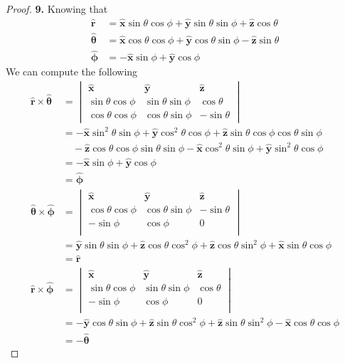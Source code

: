 \documentclass[11pt]{article}
\newcommand{\hatx}{\bm{\hat{x}}}
\newcommand{\haty}{\bm{\hat{y}}}
\newcommand{\hatz}{\bm{\hat{z}}}
\newcommand{\hatphi}{\bm{\hat{\phi}}}
\newcommand{\hatr}{\bm{\hat{r}}}
\newcommand{\hattheta}{\bm{\hat{\theta}}}
\theoremstyle{definition}
\begin{document}
\begin{proof}{\textbf{9.}}
    Knowing that
    \begin{align*}
        \hatr &= \hatx\sin\theta\cos\phi + \haty\sin\theta\sin\phi + \hatz\cos\theta\\
        \hattheta &= \hatx\cos\theta\cos\phi + \haty\cos\theta\sin\phi - \hatz\sin\theta\\
        \hatphi &= -\hatx \sin\phi + \haty\cos\phi
    \end{align*}
    We can compute the following
    \begin{align*}
        \hatr \times \hattheta &= \begin{vmatrix}
            \hatx & \haty & \hatz \\
            \sin\theta\cos\phi & \sin\theta\sin\phi & \cos\theta\\
            \cos\theta\cos\phi & \cos\theta\sin\phi &  -\sin\theta
        \end{vmatrix}\\
        &= -\hatx\sin^2\theta\sin\phi + \haty\cos^2\theta\cos\phi
        + \hatz\sin\theta\cos\phi\cos\theta\sin\phi\\
        &\quad - \hatz\cos\theta\cos\phi\sin\theta\sin\phi
        - \hatx\cos^2\theta\sin\phi +\haty\sin^2\theta\cos\phi \\
        &= -\hatx\sin\phi + \haty\cos\phi\\
        &= \hatphi\\
        \hattheta \times \hatphi &= \begin{vmatrix}
            \hatx & \haty & \hatz \\
            \cos\theta\cos\phi & \cos\theta\sin\phi & -\sin\theta\\
            -\sin\phi & \cos\phi & 0 \\
        \end{vmatrix}\\
        &= \haty\sin\theta\sin\phi + \hatz\cos\theta\cos^2\phi
        + \hatz\cos\theta\sin^2\phi + \hatx\sin\theta\cos\phi\\
        &= \hatr\\
        \hatr \times \hatphi &= \begin{vmatrix}
            \hatx & \haty & \hatz \\
            \sin\theta\cos\phi & \sin\theta\sin\phi & \cos\theta\\
            -\sin\phi & \cos\phi & 0 \\
        \end{vmatrix}\\
        &= -\haty\cos\theta\sin\phi + \hatz\sin\theta\cos^2\phi
        + \hatz\sin\theta\sin^2\phi -\hatx\cos\theta\cos\phi\\
        &= -\hattheta
    \end{align*}
\end{proof}
\end{document}
